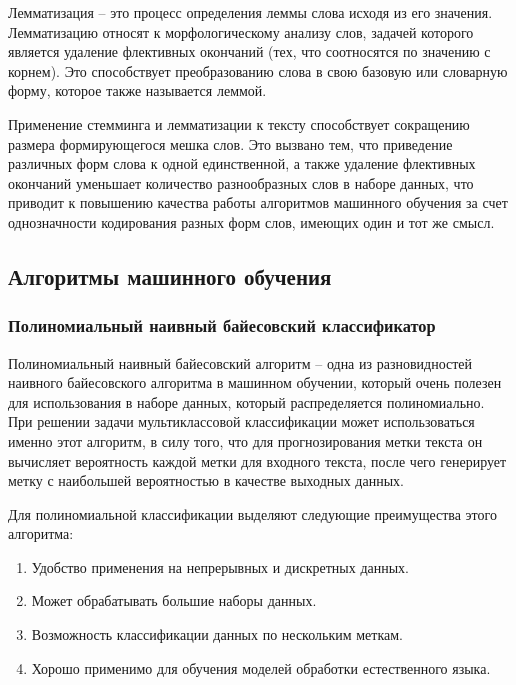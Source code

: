 \documentclass[bachelor, och, coursework]{SCWorks}
\begin{document}
            Лемматизация – это процесс определения леммы слова исходя из его
            значения. Лемматизацию относят к морфологическому анализу слов,
            задачей которого является удаление флективных окончаний (тех, что
            соотносятся по значению с корнем). Это способствует преобразованию
            слова в свою базовую или словарную форму, которое также называется
            леммой.

            Применение стемминга и лемматизации к тексту способствует сокращению
            размера формирующегося мешка слов. Это вызвано тем, что приведение
            различных форм слова к одной единственной, а также удаление
            флективных окончаний уменьшает количество разнообразных слов в
            наборе данных, что приводит к повышению качества работы алгоритмов
            машинного обучения за счет однозначности кодирования разных форм
            слов, имеющих один и тот же смысл. \cite{coll}
            

    \subsection{Алгоритмы машинного обучения}
        \subsubsection{Полиномиальный наивный байесовский классификатор}
            

            Полиномиальный наивный байесовский алгоритм – одна из разновидностей
            наивного байесовского алгоритма в машинном обучении, который очень
            полезен для использования в наборе данных, который распределяется
            полиномиально. При решении задачи мультиклассовой классификации
            может использоваться именно этот алгоритм, в силу того, что для
            прогнозирования метки текста он вычисляет вероятность каждой метки
            для входного текста, после чего генерирует метку с наибольшей
            вероятностью в качестве выходных данных. \cite{nb}

            Для полиномиальной классификации выделяют следующие преимущества
            этого алгоритма:

                \begin{enumerate}
                    \item Удобство применения на непрерывных и дискретных
                    данных.
                    \item Может обрабатывать большие наборы данных.
                    \item Возможность классификации данных по нескольким меткам.
                    \item Хорошо применимо для обучения моделей обработки
                    естественного языка.
                \end{enumerate}
\end{document}
